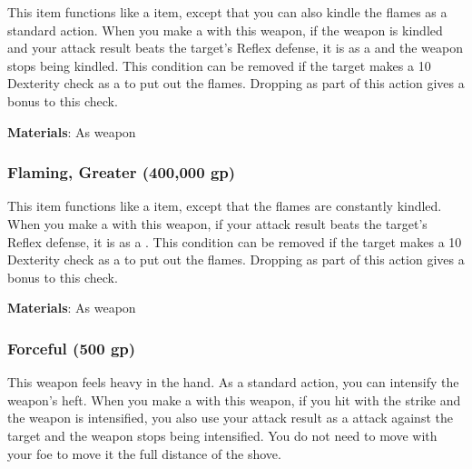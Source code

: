 This item functions like a  item, except that you can also kindle the flames as a standard action.
When you make a  with this weapon, if the weapon is kindled and your attack result beats the target's Reflex defense,
it is  as a  and the weapon stops being kindled.
This condition can be removed if the target makes a  10 Dexterity check as a  to put out the flames.
Dropping  as part of this action gives a  bonus to this check.



\vspace{0.25em}
\textbf{Materials}: As weapon


\lowercase{\hypertarget{item:Flaming, Greater}{}}\label{item:Flaming, Greater}
\hypertarget{item:Flaming, Greater}{\subsubsection{Flaming, Greater\hfill{} (400,000 gp)}}

This item functions like a  item, except that the flames are constantly kindled.
When you make a  with this weapon, if your attack result beats the target's Reflex defense, it is  as a .
This condition can be removed if the target makes a  10 Dexterity check as a  to put out the flames.
Dropping  as part of this action gives a  bonus to this check.



\vspace{0.25em}
\textbf{Materials}: As weapon


\lowercase{\hypertarget{item:Forceful}{}}\label{item:Forceful}
\hypertarget{item:Forceful}{\subsubsection{Forceful\hfill{} (500 gp)}}

This weapon feels heavy in the hand.
As a standard action, you can intensify the weapon's heft.
When you make a  with this weapon, if you hit with the strike and the weapon is intensified,
you also use your attack result as a  attack against the target and the weapon stops being intensified.
You do not need to move with your foe to move it the full distance of the shove.



